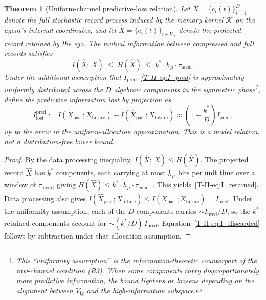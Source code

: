 \documentclass[12pt,a4paper,openany]{book}
\newtheorem{theorem}{Theorem}[chapter]
\begin{document}
\begin{theorem}[Uniform-channel predictive-loss relation]
\label{T-II-thm:tradeoff}
Let $X = \{c_i(t)\}_{i=1}^{D}$ denote the full stochastic
record process induced by the memory kernel $\mathcal{K}$
on the agent's internal coordinates, and let
$\hat{X} = \{c_i(t)\}_{i \in V_{\mathrm{fg}}}$ denote the
projected record retained by the ego.
The mutual information between compressed and full records satisfies
\begin{equation}
\label{T-II-eq:I_retained}
I(\hat{X};\,X) \;\leq\; H(\hat{X})
\;\leq\; k^* \cdot h_\mu \cdot \tau_{\mathrm{mem}}.
\end{equation}
Under the additional assumption that
$I_{\mathrm{pred}}$~\eqref{T-II-eq:I_pred} is approximately
uniformly distributed across the $D$ algebraic components
in the symmetric phase\footnote{%
This ``uniformity assumption'' is the information-theoretic
counterpart of the raw-channel condition (B3).
When some components carry disproportionately more predictive
information, the bound tightens or loosens depending on the
alignment between $V_{\mathrm{fg}}$ and the high-information
subspace.},
define the predictive information lost by projection as
\begin{equation}
\label{T-II-eq:I_discarded}
I_{\mathrm{lost}}^{\mathrm{pred}}
:= I(X_{\mathrm{past}};X_{\mathrm{future}})
-I(\hat X_{\mathrm{past}};X_{\mathrm{future}})
\approx \left(1 - \frac{k^*}{D}\right) I_{\mathrm{pred}},
\end{equation}
up to the error in the uniform-allocation approximation.  This is a
model relation, not a distribution-free lower bound.
\end{theorem}

\begin{proof}
By the data processing inequality,
$I(\hat{X};\,X) \leq H(\hat{X})$.
The projected record $\hat{X}$ has $k^*$ components,
each carrying at most $h_\mu$ bits per unit time over a
window of $\tau_{\mathrm{mem}}$, giving
$H(\hat{X}) \leq k^* \cdot h_\mu \cdot
\tau_{\mathrm{mem}}$~\cite{CoverThomas2006}.
This yields~\eqref{T-II-eq:I_retained}.
Data processing also gives
$I(\hat X_{\mathrm{past}};X_{\mathrm{future}})\leq
I(X_{\mathrm{past}};X_{\mathrm{future}})=I_{\mathrm{pred}}$.
Under the uniformity assumption, each of the $D$ components
carries $\sim I_{\mathrm{pred}}/D$, so the $k^*$ retained
components account for $\sim (k^*/D)\,I_{\mathrm{pred}}$.
Equation~\eqref{T-II-eq:I_discarded} follows by subtraction under that
allocation assumption.
\end{proof}
\end{document}
